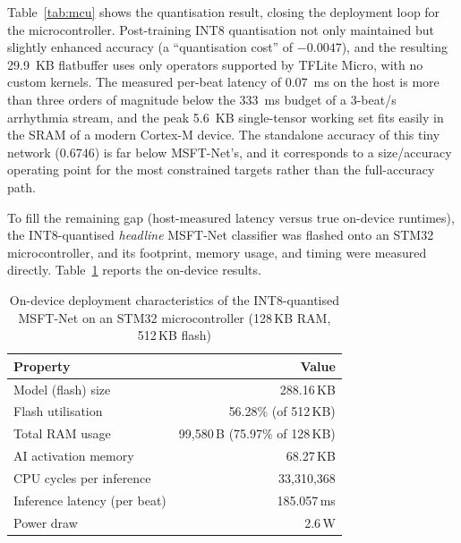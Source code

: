 Table~\ref{tab:mcu} shows the quantisation result, closing the deployment
loop for the microcontroller. Post-training INT8 quantisation not only
maintained but slightly enhanced accuracy (a ``quantisation cost'' of
$-0.0047$), and the resulting 29.9~KB flatbuffer uses only operators
supported by TFLite Micro, with no custom kernels. The measured per-beat
latency of 0.07~ms on the host is more than three orders of magnitude below
the 333~ms budget of a 3-beat/s arrhythmia stream, and the peak 5.6~KB
single-tensor working set fits easily in the SRAM of a modern Cortex-M
device. The standalone accuracy of this tiny network (0.6746) is far below
MSFT-Net's, and it corresponds to a size/accuracy operating point for the
most constrained targets rather than the full-accuracy path.

To fill the remaining gap (host-measured latency versus true on-device
runtimes), the INT8-quantised \emph{headline} MSFT-Net classifier was
flashed onto an STM32 microcontroller, and its footprint, memory usage, and
timing were measured directly. Table~\ref{tab:stm32} reports the on-device
results.

\begin{table}[!t]
\centering
\caption{On-device deployment characteristics of the INT8-quantised MSFT-Net on an STM32 microcontroller (128\,KB RAM, 512\,KB flash)}
\label{tab:stm32}
\begin{tabular}{lr}
\toprule
\textbf{Property} & \textbf{Value} \\
\midrule
Model (flash) size        & 288.16\,KB \\
Flash utilisation         & 56.28\% (of 512\,KB) \\
Total RAM usage           & 99{,}580\,B (75.97\% of 128\,KB) \\
AI activation memory      & 68.27\,KB \\
CPU cycles per inference  & 33{,}310{,}368 \\
Inference latency (per beat) & 185.057\,ms \\
Power draw                & 2.6\,W \\
\bottomrule
\end{tabular}
\end{table}

